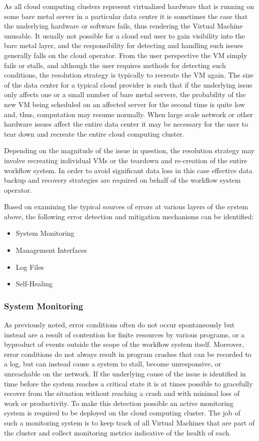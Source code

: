 As all cloud computing clusters represent virtualized hardware that is running on some bare metal server in a particular data center it is sometimes the case that the underlying hardware or software fails, thus rendering the Virtual Machine unusable. It usually not possible for a cloud end user to gain visibility into the bare metal layer, and the responsibility for detecting and handling such issues generally falls on the cloud operator. From the user perspective the VM simply fails or stalls, and although the user requires methods for detecting such conditions, the resolution strategy is typically to recreate the VM again. The size of the data center for a typical cloud provider is such that if the underlying issue only affects one or a small number of bare metal servers, the probability of the new VM being scheduled on an affected server for the second time is quite low and, thus, computation may resume normally. When large scale network or other hardware issues affect the entire data center it may be necessary for the user to tear down and recreate the entire cloud computing cluster.

Depending on the magnitude of the issue in question, the resolution strategy may involve recreating individual VMs or the teardown and re-creation of the entire workflow system. In order to avoid significant data loss in this case effective data backup and recovery strategies are required on behalf of the workflow system operator.


Based on examining the typical sources of errors at various layers of the system above, the following error detection and mitigation mechanisms can be identified:

\begin{itemize}
\item System Monitoring
\item Management Interfaces
\item Log Files
\item Self-Healing
\end{itemize}

\subsubsection {System Monitoring}

As previously noted, error conditions often do not occur spontaneously but instead are a result of contention for finite resources by various programs, or a byproduct of events outside the scope of the workflow system itself. Moreover, error conditions do not always result in program crashes that can be recorded to a log, but can instead cause a system to stall, become unresponsive, or unreachable on the network. If the underlying cause of the issue is identified in time before the system reaches a critical state it is at times possible to gracefully recover from the situation without reaching a crash and with minimal loss of work or productivity. To make this detection possible an active monitoring system is required to be deployed on the cloud computing cluster. The job of such a monitoring system is to keep track of all Virtual Machines that are part of the cluster and collect monitoring metrics indicative of the health of each.

